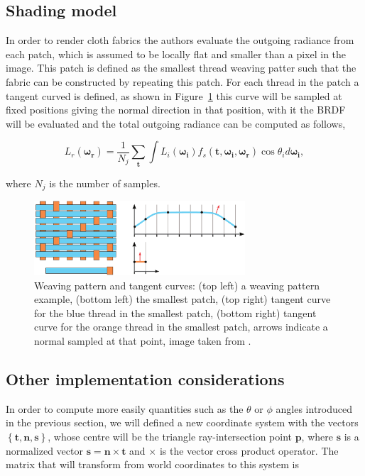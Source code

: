 \documentclass[12pt]{article}
\newcommand{\omegai}{\boldsymbol{\omega_i}}
\newcommand{\omegar}{\boldsymbol{\omega_r}}
\newcommand{\tb}{\mathbf{t}}
\begin{document}
\subsection{Shading model}
\label{sec:shading_model}

In order to render cloth fabrics the authors evaluate the outgoing radiance from each patch, which is assumed to be locally flat and smaller than a pixel in the image.
This patch is defined as the smallest thread weaving patter such that the fabric can be constructed by repeating this patch.
For each thread in the patch a tangent curved is defined, as shown in Figure~\ref{fig:tanget_curve} this curve will be sampled at fixed positions giving the normal direction in that position, with it the BRDF will be evaluated and the total outgoing radiance can be computed as follows,

\begin{equation}
L_{r}(\omegar) = \frac{1}{N_j} \sum_\tb \int L_i(\omegai) f_s(\tb, \omegai, \omegar) \cos \theta_i d \omegai,
\end{equation}

where $N_j$ is the number of samples.

\begin{figure}[htbp!]
\centering
\includegraphics[width=0.7\textwidth]{images/tanget_curve}
	\caption{Weaving pattern and tangent curves: (top left) a weaving pattern example, (bottom left) the smallest patch, (top right) tangent curve for the blue thread in the smallest patch, (bottom right) tangent curve for the orange thread in the smallest patch, arrows indicate a normal sampled at that point, image taken from \cite{Sadeghi2013}.}
	\label{fig:tanget_curve}
\end{figure}

\subsection{Other implementation considerations}

In order to compute more easily quantities such as the $\theta$ or $\phi$ angles introduced in the previous section, we will defined a new coordinate system with the vectors $\left\lbrace \tb,\mathbf{n},\mathbf{s} \right\rbrace$, whose centre will be the triangle ray-intersection point $\mathbf{p}$, where $\mathbf{s}$ is a normalized vector $\mathbf{s} = \mathbf{n} \times \tb$ and $\times$ is the vector cross product operator.
The matrix that will transform from world coordinates to this system is
\end{document}
